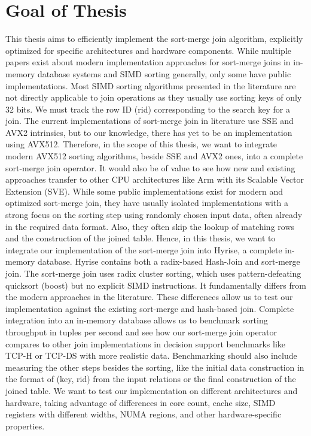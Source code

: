 \section{Goal of Thesis}
\label{sec:goal}


This thesis aims to efficiently implement the sort-merge join algorithm,
explicitly optimized for specific architectures and hardware components. While multiple papers
exist about modern implementation approaches for sort-merge joins in in-memory database systems
and SIMD sorting generally, only some have public implementations. Most SIMD sorting algorithms
presented in the literature are not directly applicable to join operations as they usually use
sorting keys of only 32 bits. We must track the row ID (rid) corresponding to the search key for
a join. The current implementations of sort-merge join in literature use SSE and AVX2 intrinsics,
but to our knowledge, there has yet to be an implementation using AVX512. Therefore, in the scope
of this thesis, we want to integrate modern AVX512 sorting algorithms, beside SSE and AVX2 ones, into a complete sort-merge
join operator. It would also be of value to see how new and existing approaches transfer to other
CPU architectures like Arm with its Scalable Vector Extension (SVE). While some public implementations
exist for modern and optimized sort-merge join, they have usually isolated implementations with a strong
focus on the sorting step using randomly chosen input data, often already in the required data format. 
Also, they often skip the lookup of matching rows and the construction of the joined table.
Hence, in this thesis, we want to integrate our implementation of the sort-merge join into Hyrise,
a complete in-memory database. Hyrise contains both a radix-based Hash-Join and sort-merge join.
The sort-merge join uses radix cluster sorting, which uses pattern-defeating quicksort (boost)
but no explicit SIMD instructions. It fundamentally differs from the modern approaches in the literature.
These differences allow us to test our implementation against the existing sort-merge and hash-based join.
Complete integration into an in-memory database allows us to benchmark sorting throughput in
tuples per second and see how our sort-merge join operator compares to other join implementations
in decision support benchmarks like TCP-H or TCP-DS with more realistic data. Benchmarking should
also include measuring the other steps besides the sorting, like the initial data construction in
the format of (key, rid) from the input relations or the final construction of the joined table.
We want to test our implementation on different architectures and hardware, taking advantage of
differences in core count, cache size, SIMD registers with different widths, NUMA regions, 
and other hardware-specific properties.
